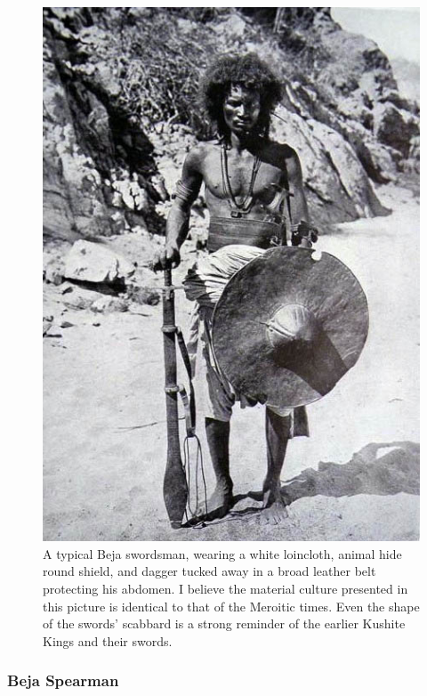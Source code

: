 \documentclass[a4paper,12pt]{scrreprt}
\begin{document}
\begin{figure}[H]
	\centering
	\includegraphics[width=\textwidth]{img/beja/beja_swordsman}
	\caption{A typical Beja swordsman, wearing a white loincloth, animal hide round shield, and dagger tucked away in a broad leather belt protecting his abdomen. I believe the material culture presented in this picture is identical to that of the Meroitic times. Even the shape of the swords' scabbard is a strong reminder of the earlier Kushite Kings and their swords.}
\end{figure}

\subsubsection{Beja Spearman}
\end{document}
